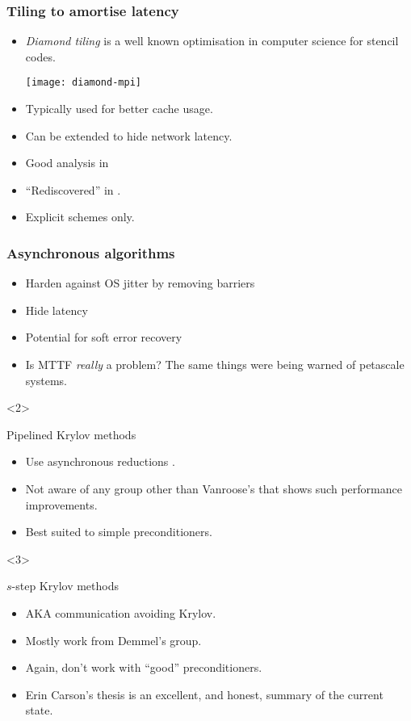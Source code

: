 \documentclass[presentation]{beamer}
\begin{document}
\begin{frame}
  \frametitle{Tiling to amortise latency}
  \begin{itemize}
  \item  \emph{Diamond tiling} is a well known optimisation in computer
    science for stencil codes.

    \begin{center}
      \texttt{[image: diamond-mpi]}
    \end{center}
  \item Typically used for better cache usage.
  \item Can be extended to hide network latency.
  \item Good analysis in \textcite{Malas:2015}
  \item ``Rediscovered'' in \textcite{Alhubail:2016}.
  \item Explicit schemes only.
  \end{itemize}
\end{frame}

\begin{frame}[t]
  \frametitle{Asynchronous algorithms}
  \begin{itemize}
  \item Harden against OS jitter by removing barriers
  \item Hide latency
  \item Potential for soft error recovery
  \item Is MTTF \emph{really} a problem?  The same things were being
    warned of petascale systems.
  \end{itemize}

  \begin{onlyenv}<2>
    \begin{block}{Pipelined Krylov methods}
      \begin{itemize}
      \item Use asynchronous reductions \textcite{Ghysels:2013a}.
      \item Not aware of any group other than Vanroose's that shows
        such performance improvements.
      \item Best suited to simple preconditioners.
      \end{itemize}
    \end{block}
  \end{onlyenv}

  \begin{onlyenv}<3>
    \begin{block}{$s$-step Krylov methods}
      \begin{itemize}
      \item AKA communication avoiding Krylov.
      \item Mostly work from Demmel's group.
      \item Again, don't work with ``good'' preconditioners.
      \item Erin Carson's thesis \parencite{Carson:2015} is an
        excellent, and honest, summary of the current state.
      \end{itemize}
    \end{block}
  \end{onlyenv}
\end{frame}
\end{document}
